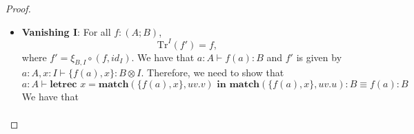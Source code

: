 \begin{example}
\begin{proof}
\begin{itemize}
\begin{align*}
  &\equiv g(\textbf{match}(f(a,x), \alpha\beta.\beta))
\end{align*}
and
\begin{align*}
  \textbf{match}(\textbf{match}(f(a,x),uv.\{u,g(v)\}), uv.u) &\equiv \textbf{match}(\{\textbf{match}(f(a,x), \alpha\beta.\alpha), g(\textbf{match}(f(a,x), \alpha\beta.\beta))\}, uv.u)\\
  &\equiv \textbf{match}(f(a,x), \alpha\beta.\alpha).
\end{align*}
Hence,
\begin{align*}
  a : A \vdash &\textbf{letrec } x = \textbf{match}(\textbf{match}(f(a,x), uv.\{u,g(v)\}), uv.v) \textbf{ in } \textbf{match}(\textbf{match}(f(a,x), uv. \{u, g(v)\}), uv.u) : B \equiv\\
  &\equiv \textbf{letrec } x = g(\textbf{match}(f(a,x), \alpha\beta.\beta)) \textbf{ in } \textbf{match}(f(a,x), \alpha\beta.\alpha) : B\\
  &\text{by \cref{lemma:letrec}}\\
  &\equiv \textbf{letrec } x = (\textbf{letrec } y = \textbf{match}(f(a,x),\alpha\beta.\beta)) \textbf{ in } g(y)) \textbf{ in } \textbf{match}(f(a,x), \alpha\beta.\alpha)\\
  &\text{by \cref{eq:let_equations:merge_bind}}\\
  &\equiv \textbf{letrec } x = g(y), y = \textbf{match}(f(a,g(x)), \alpha\beta.\beta) \textbf{ in } \textbf{match}(f(a,x), \alpha\beta.\alpha) : B\\
  &\text{by \cref{eq:let_equations:subst}}\\
  &\equiv \textbf{letrec } x = g(y), y = \textbf{match}(f(a,g(y)), \alpha\beta.\beta) \textbf{ in } \textbf{match}(f(a,g(y)), \alpha\beta.\alpha) : B\\
  &\text{by \cref{eq:let_equations:gc}}\\
  &\equiv \textbf{letrec } y = \textbf{match}(f(a,g(y)), \alpha\beta.\beta) \textbf{ in } \textbf{match}(f(a,g(y)), \alpha\beta.\alpha) : B
  \end{align*}
Up to $\alpha$-equivalence this is what we needed.
\item \textbf{Vanishing I}: For all $f : (A;B)$,
\[
\text{Tr}^{I}(f') = f,
\]
where $f' = \xi_{B,I} \circ (f,id_{I})$.
We have that $a : A \vdash f(a) : B$ and $f'$ is given by $a : A, x : I \vdash \{f(a), x\} : B \otimes I$.
Therefore, we need to show that
\[
a : A \vdash \textbf{letrec } x = \textbf{match}(\{f(a), x\}, uv.v) \textbf{ in } \textbf{match}(\{f(a), x\}, uv.u) : B \equiv f(a) : B
\]
We have that
\begin{align*}

\end{align*}
\end{itemize}
\end{proof}
\end{example}
